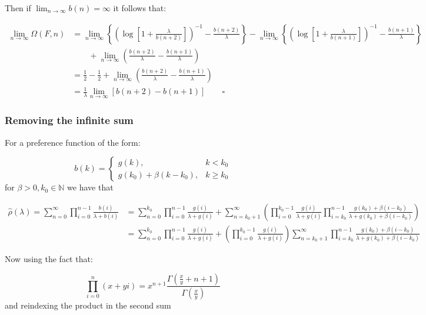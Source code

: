 \documentclass[
  sn-basic,
]{sn-jnl}
\theoremstyle{plain}
\theoremstyle{remark}
\begin{document}
Then if \(\lim_{n\rightarrow\infty}b(n)=\infty\) it follows that:

\begin{align*}
\lim_{n\rightarrow\infty}\Omega(F,n) &= \lim_{n\rightarrow\infty}\left\{ \left(\log\left[1+\frac{\lambda}{b(n+2)}\right]\right)^{-1}-\frac{b(n+2)}{\lambda}\right\} - \lim_{n\rightarrow\infty}\left\{ \left(\log\left[1+\frac{\lambda}{b(n+1)}\right]\right)^{-1}-\frac{b(n+1)}{\lambda}\right\}\\
&\qquad+\lim_{n\rightarrow\infty}\left(\frac{b(n+2)}{\lambda}-\frac{b(n+1)}{\lambda}\right)\\
&=\frac{1}{2}-\frac{1}{2} + \lim_{n\rightarrow\infty}\left(\frac{b(n+2)}{\lambda}-\frac{b(n+1)}{\lambda}\right)\\
&=\frac{1}{\lambda}\lim_{n\rightarrow\infty}\left[b(n+2)-b(n+1)\right]\qquad \square
\end{align*}

\subsubsection{Removing the infinite
sum}\label{removing-the-infinite-sum}

For a preference function of the form:

\[
b(k) = \begin{cases}
g(k),&k<k_0\\
g(k_0) + \beta(k-k_0), &k\ge k_0
\end{cases}
\] for \(\beta>0, k_0\in\mathbb N\) we have that

\begin{align*}
\hat\rho(\lambda) = \sum_{n=0}^\infty\prod_{i=0}^{n-1}\frac{b(i)}{\lambda+b(i)} &= \sum_{n=0}^{k_0}\prod_{i=0}^{n-1}\frac{g(i)}{\lambda+g(i)} + \sum_{n=k_0+1}^\infty\left(\prod_{i=0}^{k_0-1}\frac{g(i)}{\lambda+g(i)}\prod_{i=k_0}^{n-1}\frac{g(k_0) + \beta(i-k_0)}{\lambda +g(k_0) + \beta(i-k_0)}\right)\\
&=\sum_{n=0}^{k_0}\prod_{i=0}^{n-1}\frac{g(i)}{\lambda+g(i)} + \left(\prod_{i=0}^{k_0-1}\frac{g(i)}{\lambda+g(i)}\right)\sum_{n=k_0+1}^\infty\prod_{i=k_0}^{n-1}\frac{g(k_0) + \beta(i-k_0)}{\lambda +g(k_0) + \beta(i-k_0)}
\end{align*}

Now using the fact that:

\[
\prod_{i=0}^n(x+yi) = x^{n+1}\frac{\Gamma(\frac{x}{y}+n+1)}{\Gamma(\frac{x}{y})}
\] and reindexing the product in the second sum
\end{document}
